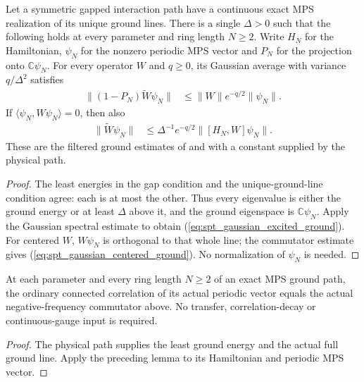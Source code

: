 \begin{lemma}
    \label{lem:spt_exact_ground_gaussian_bounds}
    \leanok
    Let a symmetric gapped interaction path have a continuous exact MPS
    realization of its unique ground lines. There is a single $\Delta>0$
    such that the following holds at every parameter and ring length
    $N\geq2$. Write $H_N$ for the Hamiltonian, $\psi_N$ for the nonzero
    periodic MPS vector and $P_N$ for the projection onto $\mathbb C\psi_N$.
    For every operator $W$ and $q\geq0$, its Gaussian average with variance
    $q/\Delta^2$ satisfies
    \begin{align}
        \|(1-P_N)\widetilde W\psi_N\|
         & \leq \|W\|e^{-q/2}\|\psi_N\|.
        \label{eq:spt_gaussian_excited_ground}
    \end{align}
    If $\langle\psi_N,W\psi_N\rangle=0$, then also
    \begin{align}
        \|\widetilde W\psi_N\|
         & \leq \Delta^{-1}e^{-q/2}\|[H_N,W]\psi_N\|.
        \label{eq:spt_gaussian_centered_ground}
    \end{align}
    These are the filtered ground estimates of
    \cite[equation \texttt{gs}]{Hastings2006Solving} and
    \cite[equations \texttt{tighter}, \texttt{tighter2}]{Hastings2007AreaLaw}
    with a constant supplied by the physical path.
\end{lemma}
\begin{proof}\leanok
    The least energies in the gap condition and the unique-ground-line
    condition agree: each is at most the other. Thus every eigenvalue is
    either the ground energy or at least $\Delta$ above it, and the ground
    eigenspace is $\mathbb C\psi_N$. Apply the Gaussian spectral estimate
    to obtain (\ref{eq:spt_gaussian_excited_ground}). For centered $W$,
    $W\psi_N$ is orthogonal to that whole line; the commutator estimate gives
    (\ref{eq:spt_gaussian_centered_ground}). No normalization of $\psi_N$
    is needed.
\end{proof}

\begin{lemma}
    \label{cor:spt_exact_ground_negative_frequency_identity}
    \leanok
    At each parameter and every ring length $N\ge2$ of an exact MPS
    ground path, the ordinary connected correlation of its actual
    periodic vector equals the actual negative-frequency commutator
    above. No transfer, correlation-decay or continuous-gauge input is
    required.
\end{lemma}
\begin{proof}\leanok
    The physical path supplies the least ground energy and the actual
    full ground line. Apply the preceding lemma to its Hamiltonian
    and periodic MPS vector.
\end{proof}

